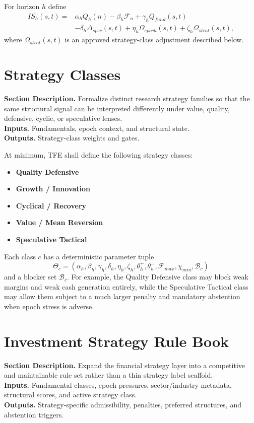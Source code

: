 \documentclass[11pt]{report}
\newcommand{\meta}[3]{\textbf{Section Description.} #1\\
\textbf{Inputs.} #2\\
\textbf{Outputs.} #3\par}
\begin{document}
For horizon $h$ define
\begin{align*}
IS_h(s,t)=&\alpha_h Q_h(n)-\beta_h \mathcal{F}_n+\gamma_h Q_{fund}(s,t)\\
&-\delta_h \Delta_{spec}(s,t)+\eta_h \Omega_{epoch}(s,t)+\zeta_h \Omega_{strat}(s,t),
\end{align*}
where $\Omega_{strat}(s,t)$ is an approved strategy-class adjustment described below.

\section{Strategy Classes}
\meta{Formalize distinct research strategy families so that the same structural signal can be interpreted differently under value, quality, defensive, cyclic, or speculative lenses.}{Fundamentals, epoch context, and structural state.}{Strategy-class weights and gates.}

At minimum, TFE shall define the following strategy classes:
\begin{itemize}
\item \textbf{Quality Defensive}
\item \textbf{Growth / Innovation}
\item \textbf{Cyclical / Recovery}
\item \textbf{Value / Mean Reversion}
\item \textbf{Speculative Tactical}
\end{itemize}

Each class $c$ has a deterministic parameter tuple
\[
\Theta_c=(\alpha_h,\beta_h,\gamma_h,\delta_h,\eta_h,\zeta_h,\theta_h^+,\theta_h^-,\mathcal{F}_{max},\chi_{min},\mathcal{B}_c)
\]
and a blocker set $\mathcal{B}_c$. For example, the Quality Defensive class may block weak margins and weak cash generation entirely, while the Speculative Tactical class may allow them subject to a much larger penalty and mandatory abstention when epoch stress is adverse.


\section{Investment Strategy Rule Book}
\meta{Expand the financial strategy layer into a competitive and maintainable rule set rather than a thin strategy label scaffold.}{Fundamental classes, epoch pressures, sector/industry metadata, structural scores, and active strategy class.}{Strategy-specific admissibility, penalties, preferred structures, and abstention triggers.}
\end{document}
